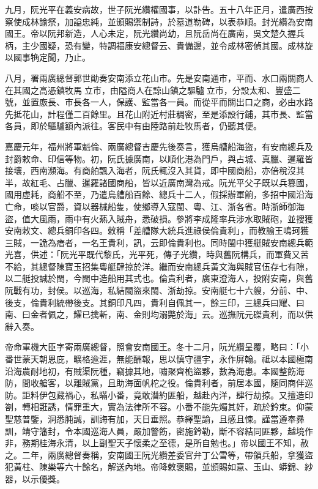 \begin{pinyinscope}
九月，阮光平在義安病故，世子阮光纘權國事，以訃告。五十八年正月，遣廣西按察使成林諭祭，加謚忠純，並頒賜禦制詩，於墓道勒碑，以表恭順。封光纘為安南國王。帝以阮邦新造，人心未定，阮光纘尚幼，且阮岳尚在廣南，吳文楚久握兵柄，主少國疑，恐有變，特調福康安總督云、貴備邊，並令成林密偵其國。成林旋以國事觕定聞，乃止。

八月，署兩廣總督郭世勛奏安南添立花山市。先是安南通市，平而、水口兩關商人在其國之高憑鎮牧馬立市，由隘商人在諒山鎮之驅驢立市，分設太和、豐盛二號，並置廒長、市長各一人，保護、監當各一員。而從平而關出口之商，必由水路先抵花山，計程僅二百餘里。且花山附近村莊稠密，至是添設行鋪，其市長、監當各員，即於驅驢額內派往。客民中有由陸路前赴牧馬者，仍聽其便。

嘉慶元年，福州將軍魁倫、兩廣總督吉慶先後奏言，獲烏艚船海盜，有安南總兵及封爵敕命、印信等物。初，阮氏據廣南，以順化港為門戶，與占城、真臘、暹羅皆接壤，西南瀕海。有商舶飄入海者，阮氏輒沒入其貨，即中國商船，亦倍稅沒其半，故紅毛、占臘、暹羅諸國商船，皆以近廣南灣為戒。阮光平父子既以兵篡國，國用虛耗，商船不至，乃遣烏艚船百餘、總兵十二人，假採辦軍餉，多招中國沿海亡命，啖以官爵，資以器械船隻，使鄉導入寇閩、粵、江、浙各省。時浙師御海盜，值大風雨，雨中有火爇入賊舟，悉破損。參將李成隆率兵涉水取賊砲，並搜獲安南敕文、總兵銅印各四。敕稱「差艚隊大統兵進祿侯倫貴利」，而教諭王鳴珂獲三賊，一詭為瘖者，一名王貴利，訊，云即倫貴利也。同時閩中獲艇賊安南總兵範光喜，供述：「阮光平既代黎氏，光平死，傳子光纘，時與舊阮構兵，而軍費又苦不給，其總督陳寶玉招集粵艇肆掠於洋。繼而安南總兵黃文海與賊官伍存七有隙，以二艇投誠於閩，今閩中造船用其式也。倫貴利者，廣東澄海人，投附安南，與舊阮戰有功，封侯。以巡海，私結閩盜來閩、浙劫掠。安南艇七十六艘，分前、中、後支，倫貴利統帶後支。其銅印凡四，貴利自佩其一，餘三印，三總兵曰耀、曰南、曰金者佩之，耀已擒斬，南、金則均溺斃於海」云。巡撫阮元磔貴利，而以供辭入奏。

帝命軍機大臣字寄兩廣總督，照會安南國王。冬十二月，阮光纘呈覆，略曰：「小番世蒙天朝恩庇，曠格逾涯，無能酬報，思以慎守疆宇，永作屏翰。祗以本國極南沿海農耐地初，有賊渠阮種，竊據其地，嘯聚齊桅盜夥，數為海患。本國整飭海防，間收艙客，以離賊黨，且助海面帆柁之役。倫貴利者，前居本國，隨同商伴巡防。詎料伊包藏禍心，私瞞小番，竟敢潛約匪船，越赴內洋，肆行劫掠。又擅造印劄，轉相誑誘，情罪重大，實為法律所不容。小番不能先燭其奸，疏於鈐束。仰蒙聖慈普鑒，洞悉肫誠，訓誨有加，天日垂照。恭繹聖諭，且感且悚。謹當遵奉彞訓，靖守籓封，令本國巡海人員，嚴加警飭，密施鈐勒，斷不容結同匪夥，越境作非，務期桂海永清，以上副聖天子懷柔之至德，是所自勉也。」帝以國王不知，赦之。二年，兩廣總督奏稱，安南國王阮光纘差委官弁丁公雪等，帶領兵船，拿獲盜犯黃柱、陳樂等六十餘名，解送內地。帝降敕褒賜，並頒賜如意、玉山、蟒錦、紗器，以示優獎。


\end{pinyinscope}
